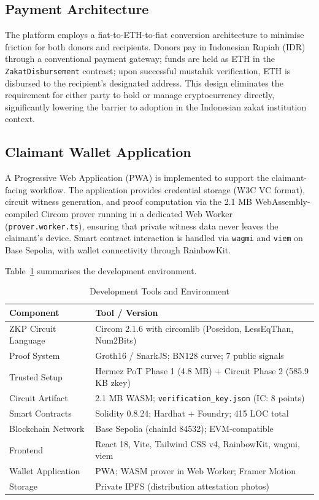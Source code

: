\documentclass[conference]{IEEEtran}
\begin{document}
\subsection{Payment Architecture}

The platform employs a fiat-to-ETH-to-fiat conversion architecture to minimise friction for both donors and recipients. Donors pay in Indonesian Rupiah (IDR) through a conventional payment gateway; funds are held as ETH in the \texttt{ZakatDisbursement} contract; upon successful mustahik verification, ETH is disbursed to the recipient's designated address. This design eliminates the requirement for either party to hold or manage cryptocurrency directly, significantly lowering the barrier to adoption in the Indonesian zakat institution context.

\subsection{Claimant Wallet Application}

A Progressive Web Application (PWA) is implemented to support the claimant-facing workflow. The application provides credential storage (W3C VC format), circuit witness generation, and proof computation via the 2.1 MB WebAssembly-compiled Circom prover running in a dedicated Web Worker (\texttt{prover.worker.ts}), ensuring that private witness data never leaves the claimant's device. Smart contract interaction is handled via \texttt{wagmi} and \texttt{viem} on Base Sepolia, with wallet connectivity through RainbowKit.

Table~\ref{tab:dev_tools} summarises the development environment.

\begin{table}[h]
\caption{Development Tools and Environment}
\label{tab:dev_tools}
\centering
\begin{tabularx}{\columnwidth}{p{2cm} X}
\toprule
\textbf{Component} & \textbf{Tool / Version} \\
\midrule
ZKP Circuit Language & Circom 2.1.6 with circomlib (Poseidon, LessEqThan, Num2Bits) \\
Proof System         & Groth16 / SnarkJS; BN128 curve; 7 public signals \\
Trusted Setup        & Hermez PoT Phase 1 (4.8 MB) + Circuit Phase 2 (585.9 KB zkey) \\
Circuit Artifact     & 2.1 MB WASM; \texttt{verification\_key.json} (IC: 8 points) \\
Smart Contracts      & Solidity 0.8.24; Hardhat + Foundry; 415 LOC total \\
Blockchain Network   & Base Sepolia (chainId 84532); EVM-compatible \\
Frontend             & React 18, Vite, Tailwind CSS v4, RainbowKit, wagmi, viem \\
Wallet Application   & PWA; WASM prover in Web Worker; Framer Motion \\
Storage              & Private IPFS (distribution attestation photos) \\
\bottomrule
\end{tabularx}
\end{table}
\end{document}
